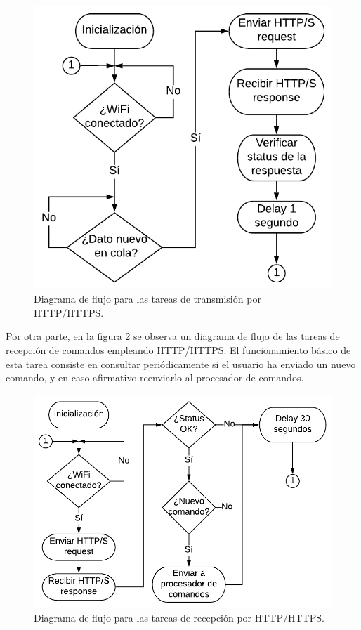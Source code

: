 \begin{figure}[h]
\centering
\includegraphics[scale=0.75]{./Figures/http_tx_task_diagram.pdf}
\caption{Diagrama de flujo para las tareas de transmisión por HTTP/HTTPS.}
\label{fig:http_tx_task_diagram}
\end{figure}

Por otra parte, en la figura \ref{fig:http_rx_task_diagram} se observa un diagrama de flujo de las tareas de recepción de comandos empleando HTTP/HTTPS. El funcionamiento básico de esta tarea consiste en consultar periódicamente si el usuario ha enviado un nuevo comando, y en caso afirmativo reenviarlo al procesador de comandos.

\begin{figure}[h]
\centering
\includegraphics[scale=0.75]{./Figures/http_rx_task_diagram.pdf}
\caption{Diagrama de flujo para las tareas de recepción por HTTP/HTTPS.}
\label{fig:http_rx_task_diagram}
\end{figure}


